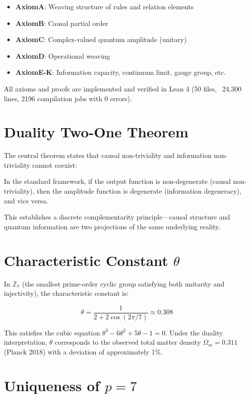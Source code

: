 \documentclass[aps,prl,twocolumn,nofootinbib,floatfix]{revtex4-2}
\begin{document}
\begin{itemize}
    \item \textbf{AxiomA}: Weaving structure of rules and relation elements
    \item \textbf{AxiomB}: Causal partial order
    \item \textbf{AxiomC}: Complex-valued quantum amplitude (unitary)
    \item \textbf{AxiomD}: Operational weaving
    \item \textbf{AxiomE-K}: Information capacity, continuum limit, gauge group, etc.
\end{itemize}

All axioms and proofs are implemented and verified in Lean 4 (50 files, ~24,300 lines, 2196 compilation jobs with 0 errors).

\section{Duality Two-One Theorem}

The central theorem states that causal non-triviality and information non-triviality cannot coexist:

\begin{theorem}
In the standard framework, if the output function is non-degenerate (causal non-triviality), then the amplitude function is degenerate (information degeneracy), and vice versa.
\end{theorem}

This establishes a discrete complementarity principle---causal structure and quantum information are two projections of the same underlying reality.

\section{Characteristic Constant $\theta$}

In $\mathbb{Z}_7$ (the smallest prime-order cyclic group satisfying both unitarity and injectivity), the characteristic constant is:

\[
\theta = \frac{1}{2 + 2\cos(2\pi/7)} \approx 0.308
\]

This satisfies the cubic equation $\theta^3 - 6\theta^2 + 5\theta - 1 = 0$. Under the duality interpretation, $\theta$ corresponds to the observed total matter density $\Omega_m = 0.311$ (Planck 2018) with a deviation of approximately 1\%.

\section{Uniqueness of $p=7$}
\end{document}
